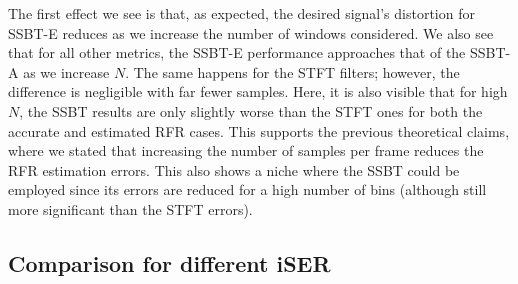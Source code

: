 The first effect we see is that, as expected, the desired signal's distortion for SSBT-E reduces as we increase the number of windows considered. We also see that for all other metrics, the SSBT-E performance approaches that of the SSBT-A as we increase $N$. The same happens for the STFT filters; however, the difference is negligible with far fewer samples. Here, it is also visible that for high $N$, the SSBT results are only slightly worse than the STFT ones for both the accurate and estimated RFR cases. This supports the previous theoretical claims, where we stated that increasing the number of samples per frame reduces the RFR estimation errors. This also shows a niche where the SSBT could be employed since its errors are reduced for a high number of bins (although still more significant than the STFT errors).


\subsection{Comparison for different iSER}

